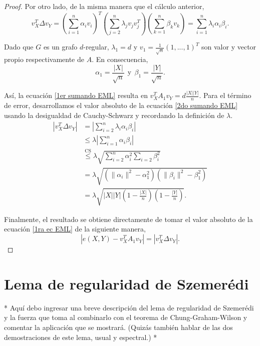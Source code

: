 \documentclass{article}[14pts]
\newcommand{\hh}[1]{{\color{red} * #1 *}}
\providecommand{\norm}[1]{\lVert#1\rVert}
\providecommand{\norm}[1]{\lVert#1\rVert}
\begin{document}
\begin{proof}
    Por otro lado, de la misma manera que el cálculo anterior,
    \begin{equation} \label{2do sumando EML}
        v_{X}^{T} \Delta v_Y = \left( \sum_{i=1}^{n}\alpha_i v_i\right)^{T}\left( \sum_{j=2}^{n}\lambda_j v_j v_{j}^{T}\right) \left( \sum_{k=1}^{n} \beta_k v_k\right) = \sum_{i=1}^{n}\lambda_i\alpha_i\beta_i .
    \end{equation}

    Dado que $G$ es un grafo $d$-regular, $\lambda_1 = d$ y $v_1 = \frac{1}{\sqrt{n}}(1,...,1)^{T}$ son valor y vector propio respectivamente de $A$. En consecuencia,
    \begin{equation*}
        \alpha_1 = \frac{|X|}{\sqrt{n}}\ \ \text{y}\ \ \beta_1 = \frac{|Y|}{\sqrt{n}}.
    \end{equation*}

    Así, la ecuación \eqref{1er sumando EML} resulta en $v_{X}^{T} A_1 v_Y = d\frac{|X||Y|}{n}$. Para el término de error, desarrollamos el valor absoluto de la ecuación \eqref{2do sumando EML} usando la desigualdad de Cauchy-Schwarz y recordando la definición de $\lambda$.
    \begin{align*}
        \left| v_{X}^{T} \Delta v_Y\right| &= \left| \sum_{i=2}^{n} \lambda_i\alpha_i\beta_i \right|\\
        &\leq \lambda \left| \sum_{i=1}^{n} \alpha_i\beta_i \right|\\
        &\overset{\mathrm{CS}}{\leq} \lambda \sqrt{\sum_{i=2}^{n}\alpha_{i}^{2} \sum_{i=2}\beta_{i}^{2}}\\
        &= \lambda \sqrt{\left( \norm{\alpha_i}^{2} - \alpha_{1}^{2}\right)\left( \norm{\beta_i}^{2} - \beta_{1}^{2}\right)}\\
        &= \lambda \sqrt{|X||Y|\left( 1- \frac{|X|}{n} \right)\left( 1 - \frac{|Y|}{n} \right)}.
    \end{align*}

    Finalmente, el resultado se obtiene directamente de tomar el valor absoluto de la ecuación \eqref{1ra ec EML} de la siguiente manera,
    \[
        \left| e(X,Y) - v_{X}^{T}A_1 v_Y\right| = \left| v_{X}^{T}\Delta v_Y\right|.
    \]
\end{proof}

\section{Lema de regularidad de Szemerédi}

\hh{Aquí debo ingresar una breve descripción del lema de regularidad de Szemerédi y la fuerza que toma al combinarlo con el teorema de Chung-Graham-Wilson y comentar la aplicación que se mostrará. (Quizás también hablar de las dos demostraciones de este lema, usual y espectral.)}
\end{document}
